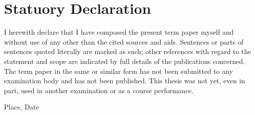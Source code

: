 \chapter*{Statuory Declaration}

I herewith declare that I have composed the present term paper myself and without use of any other than the
cited sources and aids. Sentences or parts of sentences quoted literally are marked as such; other references
with regard to the statement and scope are indicated by full details of the publications concerned. The term paper
in the same or similar form has not been submitted to any examination body and has not been published.
This thesis was not yet, even in part, used in another examination or as a course performance.

\bigskip
\bigskip
\bigskip
\bigskip
	
\begin{multicols}{2}
  \raggedright
  Place, Date
    
  \raggedleft
  \authorname
  
\end{multicols}
